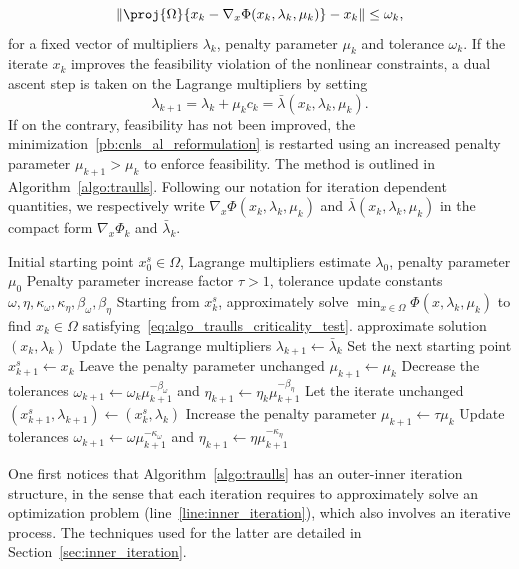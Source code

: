 \begin{equation}\label{eq:algo_traulls_criticality_test}
	\|\proj{\Omega}{x_k-\nabla_x\Phi(x_k, \lambda_k, \mu_k)}-x_k\| \le \omega_k,
\end{equation}
for a fixed vector of multipliers $\lambda_k$, penalty parameter $\mu_k$ and tolerance $\omega_k$.
If the iterate $x_k$ improves the feasibility violation of the nonlinear constraints, a dual ascent step is taken on the Lagrange multipliers by setting
\begin{equation*}
	\lambda_{k+1} = \lambda_k + \mu_k c_k = \bar{\lambda}(x_k,\lambda_k,\mu_k).
\end{equation*}
If on the contrary, feasibility has not been improved, the minimization~\eqref{pb:cnls_al_reformulation} is restarted using an increased penalty parameter $\mu_{k+1} > \mu_k$ to enforce feasibility. The method is outlined in Algorithm~\ref{algo:traulls}. Following our notation for iteration dependent quantities, we respectively write $\nabla_x\Phi(x_k, \lambda_k, \mu_k)$ and $\bar{\lambda}(x_k,\lambda_k,\mu_k)$ in the compact form $\nabla_x \Phi_k$ and $\bar{\lambda}_k$.
\begin{algorithm}
	\caption{Augmented Lagrangian algorithm}\label{algo:traulls}
	\begin{algorithmic}[1]
		\Require Initial starting point $x^s_0 \in \Omega$, Lagrange multipliers estimate $\lambda_0$, penalty parameter $\mu_0$
		\State Penalty parameter increase factor $\tau > 1$, tolerance update constants $\omega,\eta, \kappa_\omega, \kappa_\eta, \beta_\omega, \beta_\eta$
		\State\label{line:inner_iteration} Starting from $x_k^s$, approximately solve $\min_{x\in \Omega} \Phi(x,\lambda_k,\mu_k)$ to find $x_k \in \Omega$ satisfying~\eqref{eq:algo_traulls_criticality_test}.
		 \Return approximate solution $(x_k,\lambda_k)$
		\EndIf
		\State Update the Lagrange multipliers $\lambda_{k+1}\gets \bar{\lambda}_k$ 
		\State Set the next starting point $x_{k+1}^s \gets x_k $
		\State Leave the penalty parameter unchanged \(\mu_{k+1} \gets \mu_k\)
		\State Decrease the tolerances $\omega_{k+1}\gets \omega_k \mu_{k+1}^{-\beta_\omega}$ and $\eta_{k+1}\gets \eta_k \mu_{k+1}^{-\beta_\eta}$
		\Else{}
		\State Let the iterate unchanged \(\left(x_{k+1}^s,\lambda_{k+1}\right) \gets \left(x_k^s,\lambda_k\right)\)
		\State Increase the penalty parameter $\mu_{k+1} \gets \tau\mu_k$
		\State Update tolerances $\omega_{k+1}\gets \omega \mu_{k+1}^{-\kappa_\omega}$ and $\eta_{k+1}\gets \eta \mu_{k+1}^{-\kappa_\eta}$
		\EndIf
		\EndFor
	\end{algorithmic}
\end{algorithm}
One first notices that Algorithm~\ref{algo:traulls} has an outer-inner iteration structure, in the sense that each iteration requires to approximately solve an optimization problem (line~\ref{line:inner_iteration}), which also involves an iterative process. The techniques used for the latter are detailed in Section~\ref{sec:inner_iteration}.

